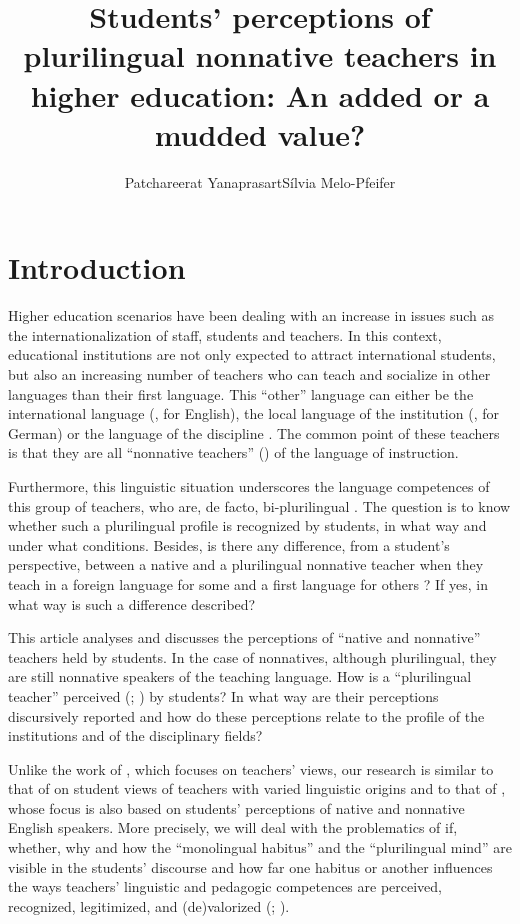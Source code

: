 \documentclass[output=paper]{../langscibook}
\author{Patchareerat Yanaprasart\affiliation{University of Geneva}\orcid{}\lastand Sílvia Melo-Pfeifer \affiliation{University of Hamburg}}
\title{Students’ perceptions of plurilingual nonnative teachers in higher education: An added or a mudded value?}
\begin{document}
\maketitle
{}%




\section{Introduction}

Higher education scenarios have been dealing with an increase in issues such as the internationalization of staff, students and teachers. In this context, educational institutions are not only expected to attract international students, but also an increasing number of teachers who can teach and socialize in other languages than their first language. This “other” language can either be the international language (\citealt{Mueller2018}, for English), the local language of the institution (\citealt{Melo-Pfeifer2017}, for German) or the language of the discipline \citep{Yanaprasart2019}. The common point of these teachers is that they are all “nonnative teachers” (\citealt{DervinBadrinathan2011}) of the language of instruction.

Furthermore, this linguistic situation underscores the language competences of this group of teachers, who are, de facto, bi-plurilingual \citep{Mueller2018}. The question is to know whether such a plurilingual profile is recognized by students, in what way and under what conditions. Besides, is there any difference, from a student’s perspective, between a native and a plurilingual nonnative teacher when they teach in a foreign language for some and a first language for others \citep{Taillefer2004}? If yes, in what way is such a difference described? 

This article analyses and discusses the perceptions of “native and nonnative” teachers held by students. In the case of nonnatives, although plurilingual, they are still nonnative speakers of the teaching language. How is a “plurilingual teacher” perceived (\citealt{Llurda2005}; \citealt{VargheseEtAl2005}) by students? In what way are their perceptions discursively reported \citep{Miller2010} and how do these perceptions relate to the profile of the institutions and of the disciplinary fields?

Unlike the work of \citet{Medgyes1992,Medgyes1994}, which focuses on teachers’ views, our research is similar to that of \citet{LiChuaChenVanTienNguyen2011} on student views of teachers with varied linguistic origins and to that of \citet{LasagabasterSierra2002}, whose focus is also based on students’ perceptions of native and nonnative English speakers. More precisely, we will deal with the problematics of if, whether, why and how the “monolingual habitus” \citep{Gogolin2008} and the “plurilingual mind” \citep{Menghini2017} are visible in the students’ discourse and how far one habitus or another influences the ways teachers’ linguistic and pedagogic competences are perceived, recognized, legitimized, and (de)valorized (\citealt{Kramsch1997}; \citealt{ClarkParan2007}).
\end{document}
